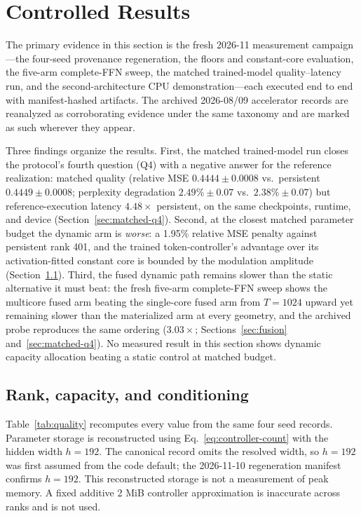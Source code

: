 \section{Controlled Results}
The primary evidence in this section is the fresh 2026-11 measurement
campaign---the four-seed provenance regeneration, the floors and
constant-core evaluation, the five-arm complete-FFN sweep, the matched
trained-model quality--latency run, and the second-architecture CPU
demonstration---each executed end to end with manifest-hashed artifacts. The
archived 2026-08/09 accelerator records are reanalyzed as corroborating
evidence under the same taxonomy and are marked as such wherever they
appear.

Three findings organize the results. First, the matched trained-model run
closes the protocol's fourth question (Q4) with a negative answer for the
reference realization: matched quality (relative MSE $0.4444 \pm 0.0008$
vs.\ persistent $0.4449 \pm 0.0008$; perplexity degradation $2.49\% \pm
0.07$ vs.\ $2.38\% \pm 0.07$) but reference-execution latency $4.48\times$
persistent, on the same checkpoints, runtime, and device
(Section~\ref{sec:matched-q4}). Second, at the closest matched parameter
budget the dynamic arm is \emph{worse}: a 1.95\% relative MSE penalty
against persistent rank 401, and the trained token-controller's advantage
over its activation-fitted constant core is bounded by the modulation
amplitude (Section~\ref{sec:rank}). Third, the fused
dynamic path remains slower than the static alternative it must beat: the
fresh five-arm complete-FFN sweep shows the multicore fused arm beating the
single-core fused arm from $T{=}1024$ upward yet remaining slower than the
materialized arm at every geometry, and the archived probe reproduces the
same ordering ($3.03\times$;
Sections~\ref{sec:fusion} and~\ref{sec:matched-q4}). No measured result in
this section shows dynamic capacity allocation beating a static control at
matched budget.

\subsection{Rank, capacity, and conditioning}\label{sec:rank}
Table~\ref{tab:quality} recomputes every value from the same four seed records.
Parameter storage is reconstructed using Eq.~\eqref{eq:controller-count} with
the hidden width $h=192$. The canonical record omits the resolved width, so
$h=192$ was first assumed from the code default; the 2026-11-10 regeneration
manifest confirms $h=192$. This reconstructed storage is not a measurement of
peak memory. A fixed additive 2 MiB controller approximation is inaccurate
across ranks and is not used.


